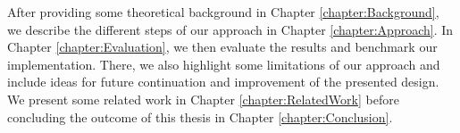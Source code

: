 After providing some theoretical background in Chapter \ref{chapter:Background}, we describe the different steps of our approach in Chapter \ref{chapter:Approach}.
In Chapter \ref{chapter:Evaluation}, we then evaluate the results and benchmark our implementation. There, we also highlight some limitations of our approach and include ideas for future continuation and improvement of the presented design. We present some related work in Chapter \ref{chapter:RelatedWork} before concluding the outcome of this thesis in Chapter \ref{chapter:Conclusion}.
